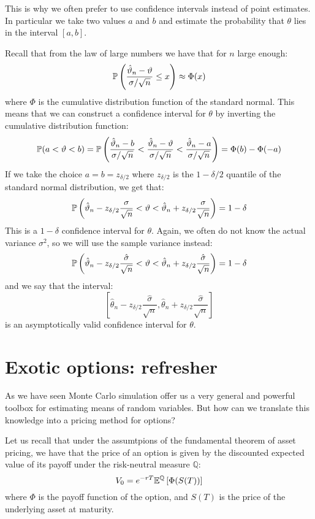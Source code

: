 This is why we often prefer to use confidence intervals instead of point
estimates. In particular we take two values $a$ and $b$ and estimate the
probability that $\theta$ lies in the interval $[a,b]$.

Recall that from the law of large numbers we have that for $n$ large enough:
\[ \P \left( \frac{\hat{\theta}_n - \theta}{\sigma / \sqrt{n}} \leq x \right)
\approx \Phi(x) \]
where $\Phi$ is the cumulative distribution function of the standard normal.
This means that we can construct a confidence interval for $\theta$ by
inverting the cumulative distribution function:
\[ \P(a < \theta < b) = \P \left( \frac{\hat{\theta}_n - b}{\sigma/\sqrt{n}}
< \frac{\hat{\theta}_n-\theta}{\sigma/\sqrt{n}} < \frac{\hat{\theta}_n-a}
{\sigma/\sqrt{n}} \right) = \Phi(b) - \Phi(-a) \]
If we take the choice $a = b = z_{\delta/2}$ where $z_{\delta/2}$ is the
$1-\delta/2$ quantile of the standard normal distribution, we get that:
\[ \P \left( \hat{\theta}_n - z_{\delta/2} \frac{\sigma}{\sqrt{n}} < \theta <
\hat{\theta}_n + z_{\delta/2} \frac{\sigma}{\sqrt{n}} \right) = 1 - \delta \]
This is a $1-\delta$ confidence interval for $\theta$.
Again, we often do not know the actual variance $\sigma^2$, so we will use the
sample variance instead:
\[ \P \left( \hat{\theta}_n - z_{\delta/2} \frac{\hat{\sigma}}{\sqrt{n}} <
\theta < \hat{\theta}_n + z_{\delta/2} \frac{\hat{\sigma}}{\sqrt{n}} \right) =
1 - \delta \]
and we say that the interval:
\[ \left[ \hat{\theta}_n - z_{\delta/2} \frac{\hat{\sigma}}{\sqrt{n}},
\hat{\theta}_n + z_{\delta/2} \frac{\hat{\sigma}}{\sqrt{n}} \right] \]
is an asymptotically valid confidence interval for $\theta$.

\section{Exotic options: refresher}
As we have seen Monte Carlo simulation offer us a very general and powerful
toolbox for estimating means of random variables. But how can we translate this
knowledge into a pricing method for options?

Let us recall that under the assumtpions of the fundamental theorem of asset
pricing, we have that the price of an option is given by the discounted
expected value of its payoff under the risk-neutral measure $\mathbb{Q}$:
\[ V_0 = e^{-rT} \E^\Q \left[ \Phi(S(T)) \right]\]
where $\Phi$ is the payoff function of the option, and $S(T)$ is the price of
the underlying asset at maturity.


